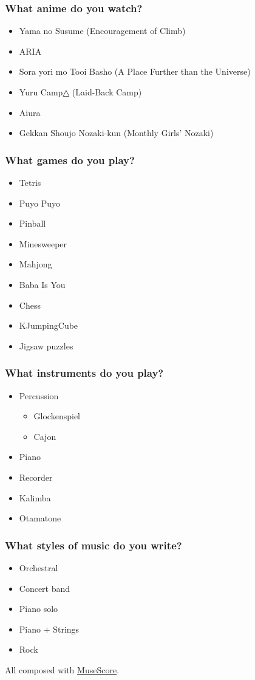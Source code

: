 \documentclass[lualatex,aspectratio=169]{beamer}
\begin{document}
  \begin{frame}
    \frametitle{What anime do you watch?}
    \begin{itemize}
      \item Yama no Susume (Encouragement of Climb)
      \item ARIA
      \item Sora yori mo Tooi Basho (A Place Further than the Universe)
      \item Yuru Camp{\symbolfont{}△} (Laid-Back Camp)
      \item Aiura
      \item Gekkan Shoujo Nozaki-kun (Monthly Girls' Nozaki)
    \end{itemize}
  \end{frame}

  \begin{frame}
    \frametitle{What games do you play?}
    \begin{itemize}
      \item Tetris
      \item Puyo Puyo
      \item Pinball
      \item Minesweeper
      \item Mahjong
      \item Baba Is You
      \item Chess
      \item KJumpingCube
      \item Jigsaw puzzles
    \end{itemize}
  \end{frame}

  \begin{frame}
    \frametitle{What instruments do you play?}
    \begin{itemize}
      \item Percussion
        \begin{itemize}
          \item Glockenspiel
          \item Cajon
        \end{itemize}
      \item Piano
      \item Recorder
      \item Kalimba
      \item Otamatone
    \end{itemize}
  \end{frame}

  \begin{frame}
    \frametitle{What styles of music do you write?}
    \begin{itemize}
      \item Orchestral
      \item Concert band
      \item Piano solo
      \item Piano + Strings
      \item Rock
    \end{itemize}

    All composed with \href{https://musescore.org/}{MuseScore}.
  \end{frame}
\end{document}
